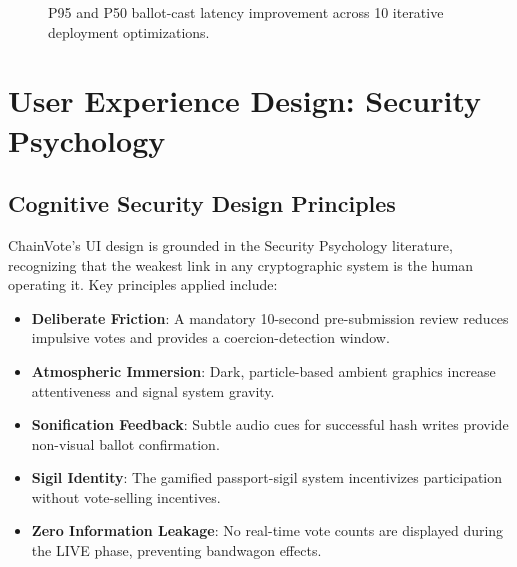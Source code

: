 \documentclass[journal,10pt,twocolumn]{IEEEtran}
\begin{document}
\begin{figure}[htbp]
\centering
{}
\caption{P95 and P50 ballot-cast latency improvement across 10 iterative deployment optimizations.}
\label{fig:latency_iterations}
\end{figure}

\section{User Experience Design: Security Psychology}

\subsection{Cognitive Security Design Principles}

ChainVote's UI design is grounded in the Security Psychology literature, recognizing that the weakest link in any cryptographic system is the human operating it. Key principles applied include:

\begin{itemize}
    \item \textbf{Deliberate Friction}: A mandatory 10-second pre-submission review reduces impulsive votes and provides a coercion-detection window.
    \item \textbf{Atmospheric Immersion}: Dark, particle-based ambient graphics increase attentiveness and signal system gravity.
    \item \textbf{Sonification Feedback}: Subtle audio cues for successful hash writes provide non-visual ballot confirmation.
    \item \textbf{Sigil Identity}: The gamified passport-sigil system incentivizes participation without vote-selling incentives.
    \item \textbf{Zero Information Leakage}: No real-time vote counts are displayed during the LIVE phase, preventing bandwagon effects.
\end{itemize}
\end{document}
